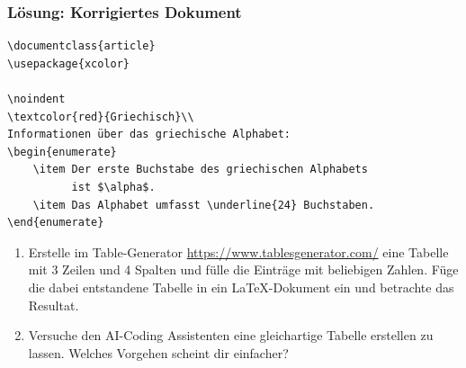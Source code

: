 \begin{frame}[fragile]
\frametitle{Lösung: Korrigiertes Dokument}
\begin{lstlisting}[style=LaTeX, basicstyle=\footnotesize\ttfamily]
\documentclass{article}
\usepackage{xcolor}

\noindent
\textcolor{red}{Griechisch}\\
Informationen über das griechische Alphabet:
\begin{enumerate}
    \item Der erste Buchstabe des griechischen Alphabets
          ist $\alpha$.
    \item Das Alphabet umfasst \underline{24} Buchstaben.
\end{enumerate}

\end{lstlisting}
\end{frame}


\begin{frame}[fragile]
\begin{myexercise}
    \begin{enumerate}
        \item Erstelle im Table-Generator \url{https://www.tablesgenerator.com/} eine Tabelle mit 3 Zeilen und 4 Spalten und fülle die Einträge mit beliebigen Zahlen. Füge die dabei entstandene Tabelle in ein \LaTeX-Dokument ein und betrachte das Resultat.
        \item Versuche den AI-Coding Assistenten eine gleichartige Tabelle erstellen zu lassen. Welches Vorgehen scheint dir einfacher?
    \end{enumerate}
\end{myexercise}
\end{frame}

